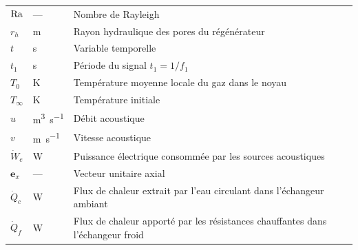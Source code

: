 \begin{center}
\begin{longtable}{p{} @{} p{} @{} p{}}
        $\mathrm{Ra}$ & --- & Nombre de Rayleigh \\
        $r_h$ & \unit{\meter} & Rayon hydraulique des pores du régénérateur \\
        $t$ & \unit{\second} & Variable temporelle \\
        $t_1$ & \unit{\second} & Période du signal $t_1 = 1/f_1$ \\
        $T_0$ & \unit{\kelvin} & Température moyenne locale du gaz dans le noyau \\
        $T_\infty$ & \unit{\kelvin} & Température initiale \\
        $u$ & \unit{\cubic\meter\per\second} & Débit acoustique \\
        $v$ & \unit{\meter\per\second} & Vitesse acoustique \\
        $\dot W_e$ & \unit{\watt} & Puissance électrique consommée par les sources acoustiques \\
        $\mathbf{e}_x$ & --- & Vecteur unitaire axial \\
        $\dot Q_c$ & \unit{\watt} & Flux de chaleur extrait par l'eau circulant dans l'échangeur ambiant \\
        $\dot Q_f$ & \unit{\watt} & Flux de chaleur apporté par les résistances chauffantes dans l'échangeur froid\\
    \end{longtable}

\bigskip


\end{center}
